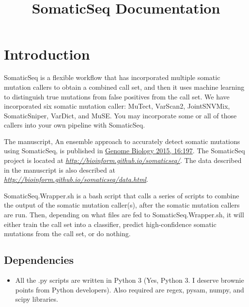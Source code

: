 \documentclass[10pt,letterpaper]{article}
\title{SomaticSeq Documentation}
\begin{document}
\maketitle



\begin{sloppypar}




\section{Introduction}

SomaticSeq is a flexible workflow that has incorporated multiple somatic mutation callers to obtain a combined call set, and then it uses machine learning to distinguish true mutations from false positives from the call set. We have incorporated six somatic mutation caller: MuTect, VarScan2, JointSNVMix, SomaticSniper, VarDict, and MuSE. You may incorporate some or all of those callers into your own pipeline with SomaticSeq.

The manuscript, An ensemble approach to accurately detect somatic mutations using SomaticSeq, is published in \href{http://dx.doi.org/10.1186/s13059-015-0758-2}{Genome Biology 2015, 16:197}. The SomaticSeq project is located at \href{http://bioinform.github.io/somaticseq/}{\textit{http://bioinform.github.io/somaticseq/}}. The data described in the manuscript is also described at \href{http://bioinform.github.io/somaticseq/data.html}{\textit{http://bioinform.github.io/somaticseq/data.html}}.

SomaticSeq.Wrapper.sh is a bash script that calls a series of scripts to combine the output of the somatic mutation caller(s), after the somatic mutation callers are run. Then, depending on what files are fed to SomaticSeq.Wrapper.sh, it will either train the call set into a classifier, predict high-confidence somatic mutations from the call set, or do nothing. 

\subsection{Dependencies}

\begin{itemize}

\item
All the .py scripts are written in Python 3 (Yes, Python 3. I deserve brownie points from Python developers). Also required are regex, pysam, numpy, and scipy libraries. 


\end{itemize}
\end{sloppypar}
\end{document}
